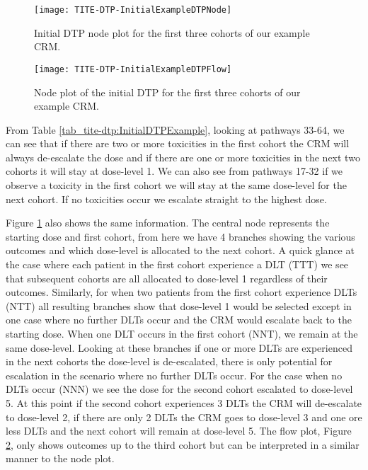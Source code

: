 \begin{figure}[h!]
	\centering
	\caption[Initial DTP node plot.]{Initial DTP node plot for the first three cohorts of our example CRM.}
	\label{fig_tite-dtp:InitialDTPExampleNode}
	\texttt{[image: TITE-DTP-InitialExampleDTPNode]}
\end{figure}

\begin{figure}[h!]
	\centering
	\caption[Initial DTP flow plot.]{Node plot of the initial DTP for the first three cohorts of our example CRM.}
	\label{fig_tite-dtp:InitialDTPExampleFlow}
	\texttt{[image: TITE-DTP-InitialExampleDTPFlow]}
\end{figure}

From Table \ref{tab_tite-dtp:InitialDTPExample}, looking at pathways 33-64, we can see that if there are two or more toxicities in the first cohort the CRM will always de-escalate the dose and if there are one or more toxicities in the next two cohorts it will stay at dose-level 1. We can also see from pathways 17-32 if we observe a toxicity in the first cohort we will stay at the same dose-level for the next cohort. If no toxicities occur we escalate straight to the highest dose. 

Figure \ref{fig_tite-dtp:InitialDTPExampleNode} also shows the same information. The central node represents the starting dose and first cohort, from here we have 4 branches showing the various outcomes and which dose-level is allocated to the next cohort. A quick glance at the case where each patient in the first cohort experience a DLT (TTT) we see that subsequent cohorts are all allocated to dose-level 1 regardless of their outcomes. Similarly, for when two patients from the first cohort experience DLTs (NTT) all resulting branches show that dose-level 1 would be selected except in one case where no further DLTs occur and the CRM would escalate back to the starting dose. When one DLT occurs in the first cohort (NNT), we remain at the same dose-level. Looking at these branches if one or more DLTs are experienced in the next cohorts the dose-level is de-escalated, there is only potential for escalation in the scenario where no further DLTs occur. For the case when no DLTs occur (NNN) we see the dose for the second cohort escalated to dose-level 5. At this point if the second cohort experiences 3 DLTs the CRM will de-escalate to dose-level 2, if there are only 2 DLTs the CRM goes to dose-level 3 and one ore less DLTs and the next cohort will remain at dose-level 5. The flow plot, Figure \ref{fig_tite-dtp:InitialDTPExampleFlow}, only shows outcomes up to the third cohort but can be interpreted in a similar manner to the node plot.

